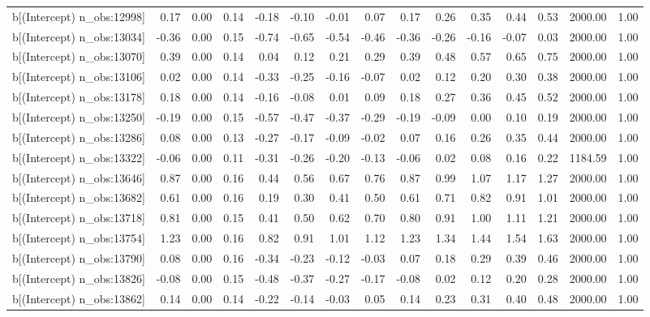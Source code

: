 \begin{table}[ht]
\begin{tabular}{rrrrrrrrrrrrrrr}
  b[(Intercept) n\_obs:12998] & 0.17 & 0.00 & 0.14 & -0.18 & -0.10 & -0.01 & 0.07 & 0.17 & 0.26 & 0.35 & 0.44 & 0.53 & 2000.00 & 1.00 \\ 
  b[(Intercept) n\_obs:13034] & -0.36 & 0.00 & 0.15 & -0.74 & -0.65 & -0.54 & -0.46 & -0.36 & -0.26 & -0.16 & -0.07 & 0.03 & 2000.00 & 1.00 \\ 
  b[(Intercept) n\_obs:13070] & 0.39 & 0.00 & 0.14 & 0.04 & 0.12 & 0.21 & 0.29 & 0.39 & 0.48 & 0.57 & 0.65 & 0.75 & 2000.00 & 1.00 \\ 
  b[(Intercept) n\_obs:13106] & 0.02 & 0.00 & 0.14 & -0.33 & -0.25 & -0.16 & -0.07 & 0.02 & 0.12 & 0.20 & 0.30 & 0.38 & 2000.00 & 1.00 \\ 
  b[(Intercept) n\_obs:13178] & 0.18 & 0.00 & 0.14 & -0.16 & -0.08 & 0.01 & 0.09 & 0.18 & 0.27 & 0.36 & 0.45 & 0.52 & 2000.00 & 1.00 \\ 
  b[(Intercept) n\_obs:13250] & -0.19 & 0.00 & 0.15 & -0.57 & -0.47 & -0.37 & -0.29 & -0.19 & -0.09 & 0.00 & 0.10 & 0.19 & 2000.00 & 1.00 \\ 
  b[(Intercept) n\_obs:13286] & 0.08 & 0.00 & 0.13 & -0.27 & -0.17 & -0.09 & -0.02 & 0.07 & 0.16 & 0.26 & 0.35 & 0.44 & 2000.00 & 1.00 \\ 
  b[(Intercept) n\_obs:13322] & -0.06 & 0.00 & 0.11 & -0.31 & -0.26 & -0.20 & -0.13 & -0.06 & 0.02 & 0.08 & 0.16 & 0.22 & 1184.59 & 1.00 \\ 
  b[(Intercept) n\_obs:13646] & 0.87 & 0.00 & 0.16 & 0.44 & 0.56 & 0.67 & 0.76 & 0.87 & 0.99 & 1.07 & 1.17 & 1.27 & 2000.00 & 1.00 \\ 
  b[(Intercept) n\_obs:13682] & 0.61 & 0.00 & 0.16 & 0.19 & 0.30 & 0.41 & 0.50 & 0.61 & 0.71 & 0.82 & 0.91 & 1.01 & 2000.00 & 1.00 \\ 
  b[(Intercept) n\_obs:13718] & 0.81 & 0.00 & 0.15 & 0.41 & 0.50 & 0.62 & 0.70 & 0.80 & 0.91 & 1.00 & 1.11 & 1.21 & 2000.00 & 1.00 \\ 
  b[(Intercept) n\_obs:13754] & 1.23 & 0.00 & 0.16 & 0.82 & 0.91 & 1.01 & 1.12 & 1.23 & 1.34 & 1.44 & 1.54 & 1.63 & 2000.00 & 1.00 \\ 
  b[(Intercept) n\_obs:13790] & 0.08 & 0.00 & 0.16 & -0.34 & -0.23 & -0.12 & -0.03 & 0.07 & 0.18 & 0.29 & 0.39 & 0.46 & 2000.00 & 1.00 \\ 
  b[(Intercept) n\_obs:13826] & -0.08 & 0.00 & 0.15 & -0.48 & -0.37 & -0.27 & -0.17 & -0.08 & 0.02 & 0.12 & 0.20 & 0.28 & 2000.00 & 1.00 \\ 
  b[(Intercept) n\_obs:13862] & 0.14 & 0.00 & 0.14 & -0.22 & -0.14 & -0.03 & 0.05 & 0.14 & 0.23 & 0.31 & 0.40 & 0.48 & 2000.00 & 1.00 \\ 

\end{tabular}
\end{table}
